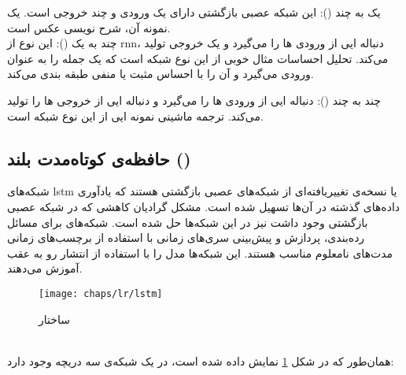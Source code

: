 % 
 یک به چند (): این شبکه عصبی بازگشتی دارای یک ورودی و چند خروجی است. یک نمونه آن، شرح نویسی عکس است.
\\

 چند به یک (): این نوع از \gls{rnn}، دنباله ایی از ورودی ها را می‌گیرد و یک خروجی تولید می‌کند. تحلیل احساسات مثال خوبی از این نوع شبکه است که یک جمله را به عنوان ورودی می‌گیرد و آن را با احساس مثبت یا منفی طبقه بندی می‌کند.

%
 
 چند به چند (): دنباله ایی از ورودی ها را می‌گیرد و دنباله ایی از خروجی ها را تولید می‌کند. ترجمه ماشینی نمونه ایی از این نوع شبکه است.


 \subsection{حافظه‌ی کوتاه‌مدت بلند ()}
 شبکه‌های \gls{lstm} یا  نسخه‌ی تغییریافته‌ای از شبکه‌های عصبی بازگشتی هستند که یادآوری داده‌های گذشته در آن‌ها تسهیل شده است. مشکل گرادیان کاهشی که در شبکه عصبی بازگشتی وجود داشت نیز در این شبکه‌ها حل شده است. شبکه‌های  برای مسائل رده‌بندی، پردازش و پیش‌بینی سری‌های زمانی با استفاده از برچسب‌های زمانی مدت‌های نامعلوم مناسب هستند. این شبکه‌ها مدل را با استفاده از انتشار رو به عقب آموزش می‌دهند. 
 \begin{figure}[!ht]
 	\centerline{\texttt{[image: chaps/lr/lstm]}}
 	\caption{ساختار }
 	\label{fig:ch_lr:lstm}
 \end{figure}
\\
همان‌طور که در شکل \ref{fig:ch_lr:lstm} نمایش داده شده است، در یک شبکه‌ی  سه دریچه وجود دارد:
 
